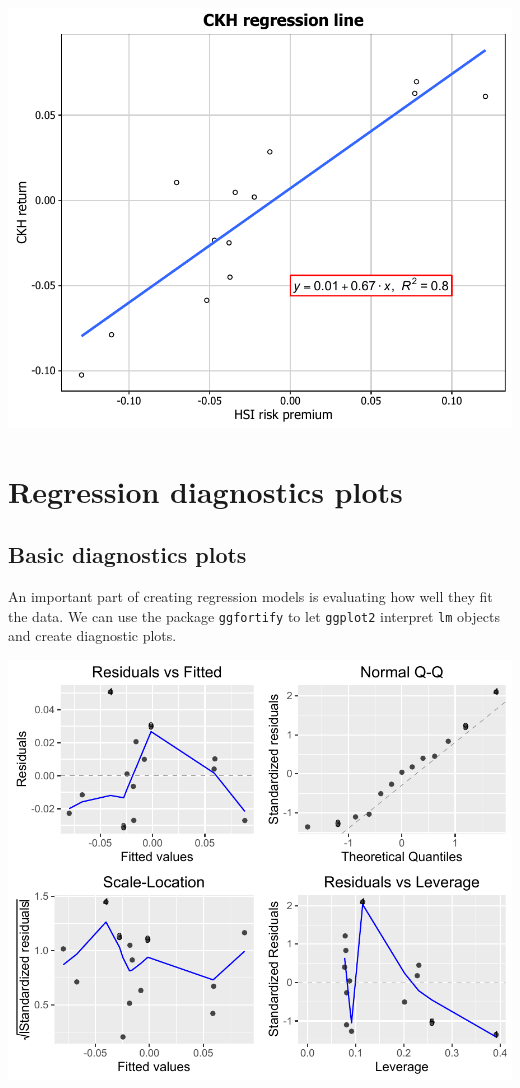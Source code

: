 \begin{center}\includegraphics[width=0.6\linewidth]{11_Linear_Regression_Plot_pdf/lr_18-1} \end{center}

\section{Regression diagnostics
plots}\label{regression-diagnostics-plots}

\subsection{Basic diagnostics plots}\label{basic-diagnostics-plots}

An important part of creating regression models is evaluating how well
they fit the data. We can use the package \texttt{ggfortify} to let
\texttt{ggplot2} interpret \texttt{lm} objects and create diagnostic
plots.

\begin{Shaded}
\begin{Highlighting}[]
 \NormalTok{)}
\end{Highlighting}
\end{Shaded}

\begin{center}\includegraphics[width=0.6\linewidth]{11_Linear_Regression_Plot_pdf/lr_19-1} \end{center}


